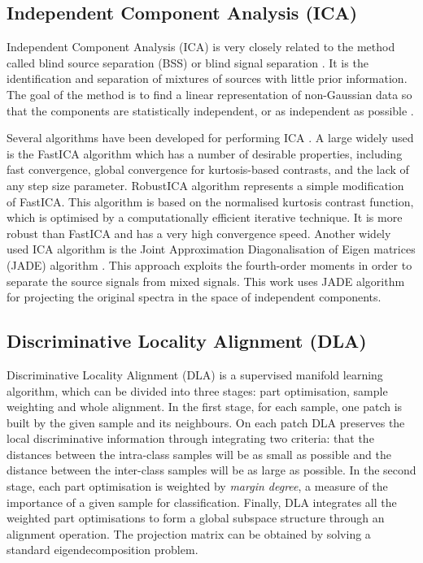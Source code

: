 \documentclass[a4paper,fleqn,usenatbib]{mnras}
\begin{document}
{\subsection{Independent Component Analysis (ICA)}

Independent Component Analysis (ICA) \citep{comon:94} is very closely
related to the method called blind source separation (BSS) or blind
signal separation \citep{jutten:91}. It is the identification and
separation of mixtures of sources with little prior information. The
goal of the method is to find a linear representation of non-Gaussian
data so that the components are statistically independent, or as
independent as possible \citep{hyvarinen:00}.

Several algorithms have been developed for performing ICA
\citep{bell:95,belouchrani:97,ollila:06,li:08}. A large widely used is
the FastICA algorithm \citep{hyvarinen:00} which has a number of
desirable properties, including fast convergence, global convergence
for kurtosis-based contrasts, and the lack of any step size parameter.
RobustICA algorithm \citep{zarzoso:10} represents a simple modification
of FastICA. This algorithm is based on the normalised kurtosis
contrast function, which is optimised by a computationally efficient
iterative technique. It is more robust than FastICA and has a very
high convergence speed.  Another widely used ICA algorithm is the
Joint Approximation Diagonalisation of Eigen matrices (JADE) algorithm
\citep{cardoso:93}. This approach exploits the fourth-order moments in
order to separate the source signals from mixed signals. This work
uses JADE algorithm for projecting the original spectra in the space
of independent components.


\subsection{Discriminative Locality Alignment (DLA)}
Discriminative Locality Alignment (DLA) \citep{zhang:2008} is a
supervised manifold learning algorithm, which can be divided into
three stages: part optimisation, sample weighting and whole
alignment. In the first stage, for each sample, one patch is built by
the given sample and its neighbours. On each patch DLA preserves the
local discriminative information through integrating two criteria:
that the distances between the intra-class samples will be as small as
possible and the distance between the inter-class samples will be as
large as possible. In the second stage, each part optimisation is
weighted by \textit{margin degree}, a measure of the importance of a
given sample for classification. Finally, DLA integrates all the
weighted part optimisations to form a global subspace structure
through an alignment operation. The projection matrix can be obtained
by solving a standard eigendecomposition problem.

}
\end{document}
